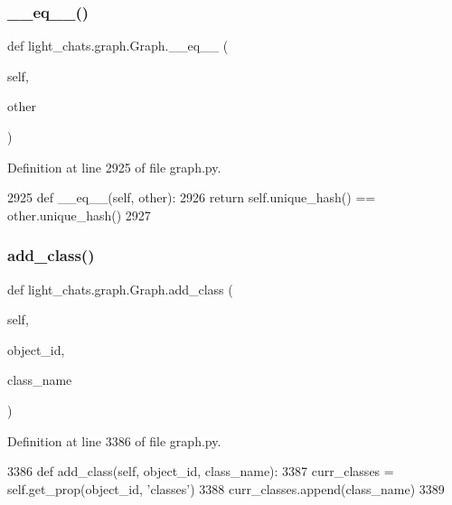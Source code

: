 \subsubsection{\texorpdfstring{\+\_\+\+\_\+eq\+\_\+\+\_\+()}{\_\_eq\_\_()}}
{\footnotesize\ttfamily def light\+\_\+chats.\+graph.\+Graph.\+\_\+\+\_\+eq\+\_\+\+\_\+ (\begin{DoxyParamCaption}\item[{}]{self,  }\item[{}]{other }\end{DoxyParamCaption})}



Definition at line 2925 of file graph.\+py.


\begin{DoxyCode}
2925     \textcolor{keyword}{def }\_\_eq\_\_(self, other):
2926         \textcolor{keywordflow}{return} self.unique\_hash() == other.unique\_hash()
2927 
\end{DoxyCode}
\mbox{\label{classlight__chats_1_1graph_1_1Graph_acb4a884cb1259a506399e8d1eb7a2f33}} 
\subsubsection{\texorpdfstring{add\+\_\+class()}{add\_class()}}
{\footnotesize\ttfamily def light\+\_\+chats.\+graph.\+Graph.\+add\+\_\+class (\begin{DoxyParamCaption}\item[{}]{self,  }\item[{}]{object\+\_\+id,  }\item[{}]{class\+\_\+name }\end{DoxyParamCaption})}



Definition at line 3386 of file graph.\+py.


\begin{DoxyCode}
3386     \textcolor{keyword}{def }add\_class(self, object\_id, class\_name):
3387         curr\_classes = self.get\_prop(object\_id, \textcolor{stringliteral}{'classes'})
3388         curr\_classes.append(class\_name)
3389 
\end{DoxyCode}
\mbox{\label{classlight__chats_1_1graph_1_1Graph_a764ec9d5d95e071d857644b1947a2385}} 
